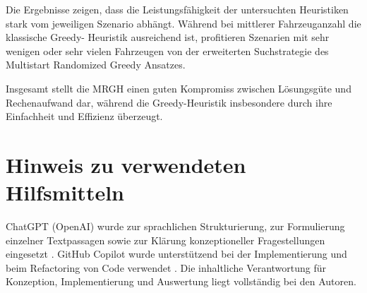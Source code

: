 \documentclass[a4paper,10pt]{article}
\begin{document}
Die Ergebnisse zeigen, dass die Leistungsfähigkeit der untersuchten Heuristiken stark vom
jeweiligen Szenario abhängt. Während bei mittlerer Fahrzeuganzahl die klassische Greedy-
Heuristik ausreichend ist, profitieren Szenarien mit sehr wenigen oder sehr vielen Fahrzeugen
von der erweiterten Suchstrategie des Multistart Randomized Greedy Ansatzes.

Insgesamt stellt die MRGH einen guten Kompromiss zwischen Lösungsgüte und Rechenaufwand dar,
während die Greedy-Heuristik insbesondere durch ihre Einfachheit und Effizienz überzeugt.

\section*{Hinweis zu verwendeten Hilfsmitteln}
ChatGPT (OpenAI) wurde zur sprachlichen Strukturierung, zur Formulierung einzelner Textpassagen
sowie zur Klärung konzeptioneller Fragestellungen eingesetzt \cite{chatgpt2025}.
GitHub Copilot wurde unterstützend bei der Implementierung und beim Refactoring
von Code verwendet \cite{copilot2025}. Die inhaltliche Verantwortung für Konzeption,
Implementierung und Auswertung liegt vollständig bei den Autoren.




\end{document}
